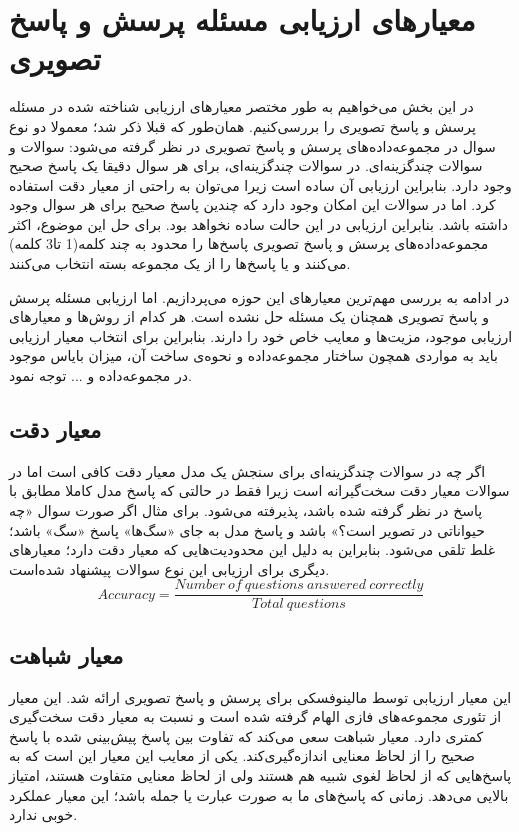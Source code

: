 \section{معیارهای ارزیابی مسئله پرسش و پاسخ تصویری}

در این بخش می‌خواهیم به طور مختصر معیارهای ارزیابی شناخته شده در مسئله پرسش و پاسخ تصویری را بررسی‌کنیم. همان‌طور که قبلا ذکر شد؛ معمولا دو نوع سوال در مجموعه‌داده‌های پرسش و پاسخ تصویری در نظر گرفته می‌شود: سوالات 
و سوالات چندگزینه‌ای. در سوالات چندگزینه‌ای، برای هر سوال دقیقا یک پاسخ صحیح وجود دارد. بنابراین ارزیابی آن ساده است زیرا می‌توان به راحتی از معیار دقت استفاده کرد. اما در سوالات
این امکان وجود دارد که چندین پاسخ صحیح برای هر سوال وجود داشته باشد. بنابراین ارزیابی در این حالت ساده نخواهد بود. برای حل این موضوع، اکثر مجموعه‌داده‌های پرسش و پاسخ تصویری پاسخ‌ها را محدود به چند کلمه(1 تا3 کلمه) می‌کنند و یا پاسخ‌ها را از یک مجموعه بسته انتخاب می‌کنند.

 در ادامه به بررسی  مهم‌ترین معیارهای این حوزه می‌پردازیم. اما ارزیابی مسئله پرسش و پاسخ تصویری همچنان یک مسئله حل نشده است. هر کدام از روش‌ها و معیارهای ارزیابی موجود، مزیت‌ها و معایب خاص خود را دارند. بنابراین برای انتخاب معیار ارزیابی باید به مواردی همچون ساختار مجموعه‌داده و نحوه‌ی ساخت آن، میزان بایاس موجود در مجموعه‌داده و ... توجه نمود. 

\subsection{معیار دقت}

		اگر چه در سوالات چندگزینه‌ای برای سنجش یک مدل معیار دقت کافی است اما در سوالات 
		معیار دقت سخت‌گیرانه است زیرا فقط در حالتی که پاسخ مدل کاملا مطابق با پاسخ در نظر گرفته شده باشد، پذیرفته می‌‌شود. برای مثال اگر صورت سوال «چه حیواناتی در تصویر است؟» باشد و پاسخ مدل به جای «سگ‌ها‌» پاسخ «سگ» باشد؛ غلط تلقی می‌شود. بنابراین به دلیل این محدودیت‌هایی که معیار دقت دارد؛ معیارهای دیگری برای ارزیابی این نوع سوالات پیشنهاد‌ شده‌است.
		\begin{equation}
		Accuracy = \frac{Number \ of \ questions \ answered \ correctly}{Total \ questions}
		\end{equation}

	
\subsection[معیار شباهت \lr{Wu-Palmer}]{معیار شباهت \cite{wu1994verb}}
	این معیار ارزیابی توسط مالینوفسکی 
	\cite{malinowski2014multi}
	برای پرسش و پاسخ تصویری ارائه شد. این معیار از تئوری مجموعه‌های فازی الهام گرفته شده است و نسبت به معیار دقت سخت‌گیری کمتری دارد. معیار شباهت 
	سعی می‌کند که تفاوت بین پاسخ پیش‌بینی شده با پاسخ صحیح  را از لحاظ معنایی اندازه‌گیری‌کند. یکی از معایب این معیار این است که به پاسخ‌هایی که از لحاظ لغوی شبیه هم هستند ولی از لحاظ معنایی متفاوت هستند، امتیاز بالایی می‌دهد. زمانی که پاسخ‌های ما به صورت عبارت یا جمله باشد؛ این  معیار عملکرد خوبی ندارد. 

